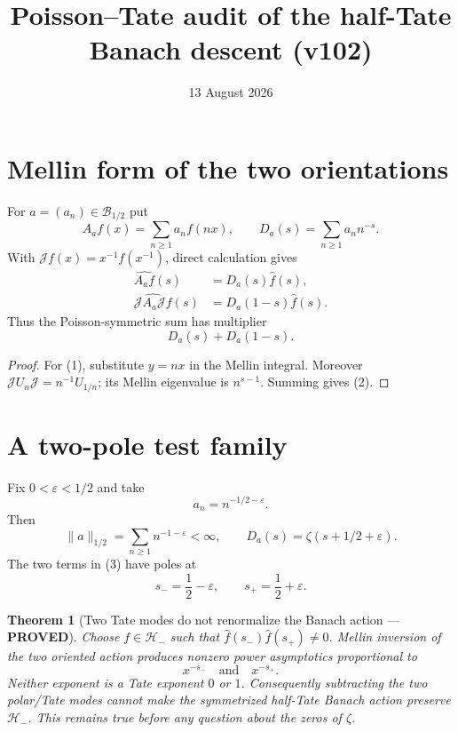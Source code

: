 \documentclass[11pt]{article}
\title{Poisson--Tate audit of the half-Tate Banach descent (v102)}
\date{13 August 2026}
\newcommand{\PROVED}{\textcolor{green!40!black}{\textbf{PROVED}}}
\newtheorem{theorem}{Theorem}
\begin{document}
\maketitle

\section{Mellin form of the two orientations}

For $a=(a_n)\in\mathcal B_{1/2}$ put
\[
 A_af(x)=\sum_{n\ge1}a_nf(nx),\qquad
 D_a(s)=\sum_{n\ge1}a_nn^{-s}.
\]
With $\mathscr Jf(x)=x^{-1}f(x^{-1})$, direct calculation gives
\begin{align}
 \widehat{A_af}(s)&=D_a(s)\widehat f(s),             \tag{1}\\
 \widehat{\mathscr JA_a\mathscr Jf}(s)
     &=D_a(1-s)\widehat f(s).                        \tag{2}
\end{align}
Thus the Poisson-symmetric sum has multiplier
\begin{equation}
                         D_a(s)+D_a(1-s).             \tag{3}
\end{equation}

\begin{proof}
For (1), substitute $y=nx$ in the Mellin integral.  Moreover
$\mathscr JU_n\mathscr J=n^{-1}U_{1/n}$; its Mellin eigenvalue is
$n^{s-1}$.  Summing gives (2).
\end{proof}

\section{A two-pole test family}

Fix $0<\varepsilon<1/2$ and take
\begin{equation}
                         a_n=n^{-1/2-\varepsilon}.    \tag{4}
\end{equation}
Then
\[
 \|a\|_{1/2}=\sum_{n\ge1}n^{-1-\varepsilon}<\infty,
 \qquad D_a(s)=\zeta(s+1/2+\varepsilon).             \tag{5}
\]
The two terms in (3) have poles at
\begin{equation}
 s_-=\frac12-\varepsilon,
 \qquad s_+=\frac12+\varepsilon.                    \tag{6}
\end{equation}

\begin{theorem}[Two Tate modes do not renormalize the Banach action ---
\PROVED]
Choose $f\in\mathcal H_-$ such that
$\widehat f(s_-)\widehat f(s_+)\ne0$.  Mellin inversion of the two
oriented action produces nonzero power asymptotics proportional to
\begin{equation}
                 x^{-s_-}\quad\text{and}\quad x^{-s_+}.        \tag{7}
\end{equation}
Neither exponent is a Tate exponent $0$ or $1$.  Consequently subtracting
the two polar/Tate modes cannot make the symmetrized half-Tate Banach action
preserve $\mathcal H_-$.  This remains true before any question about the
zeros of $\zeta$.
\end{theorem}
\end{document}
